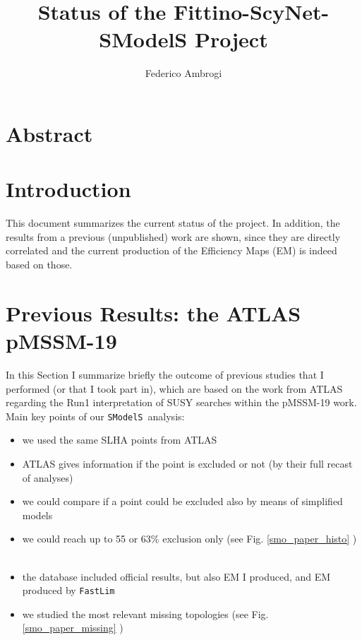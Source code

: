 \documentclass[a4paper,11pt]{article}
\begin{document}
\title{\boldmath Status of the Fittino-ScyNet-SModelS Project}

\author[a]{Federico Ambrogi}

\maketitle




\newcommand{\MG}{\texttt{MadGraph5\_aMC@NLO}}

\newcommand{\jmet}{ $3jet+E_T^{miss}$ }

\newcommand{\SMO}{ \texttt{SModelS}}
\newcommand{\FastLim}{ \texttt{FastLim}}


\section*{Abstract}


\section{Introduction}

This document summarizes the current status of the project. In addition, the results from a previous (unpublished) work are shown, since they are directly correlated and the current production of the Efficiency Maps (EM) is indeed based on those. 







\section{Previous Results: the ATLAS pMSSM-19 }
In this Section I summarize briefly the outcome of previous studies that I performed (or that I took part in), which are based on the work from ATLAS \cite{} regarding the Run1 interpretation of SUSY searches within the pMSSM-19 work. Main key points of our \SMO~analysis:
\begin{itemize}
	\item we used the same SLHA points from ATLAS \
	\item ATLAS gives information if the point is excluded or not (by their full recast of analyses) \
	\item we could compare if a point could be excluded also by means of simplified models \
	\item we could reach up to 55 or 63$\%$ exclusion only (see Fig. \ref{smo_paper_histo} ) \
	\item the database included official results, but also EM I produced, and EM produced by \FastLim~ \
	\item we studied the most relevant missing topologies (see Fig. \ref{smo_paper_missing} ) 
\end{itemize}
\end{document}
